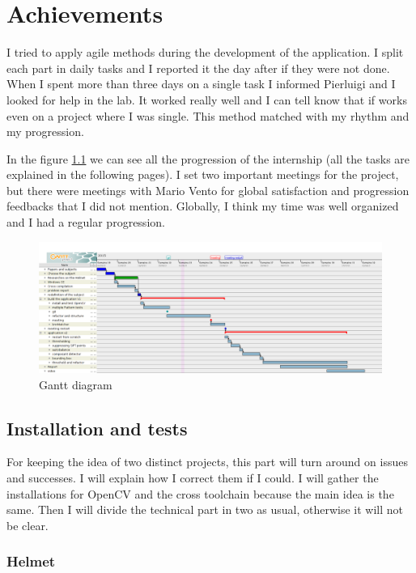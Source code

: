 \chapter{Achievements}
\par I tried to apply agile methods during the development of the application. I split each part in daily tasks and I reported it the day after if they were not done. When I spent more than three days on a single task I informed Pierluigi and I looked for help in the lab. It worked really well and I can tell know that if works even on a project where I was single. This method matched with my rhythm and my progression.
\par In the figure \ref{gantt} we can see all the progression of the internship (all the tasks are explained in the following pages). I set two important meetings for the project, but there were meetings with Mario Vento for global satisfaction and progression feedbacks that I did not mention. Globally, I think my time was well organized and I had a regular progression.
	\begin{figure}[h]
		\begin{center}
			\includegraphics[width=15cm]{images_not_compressed/gantt.png}
			\caption{Gantt diagram}
			\label{gantt}	
		\end{center}
	\end{figure}
	\section{Installation and tests}
	

\par For keeping the idea of two distinct projects, this part will turn around on issues and successes. I will explain how I correct them if I could. I will gather the installations for OpenCV and the cross toolchain because the main idea is the same. Then I will divide the technical part in two as usual, otherwise it will not be clear.


	\subsection{Helmet}
